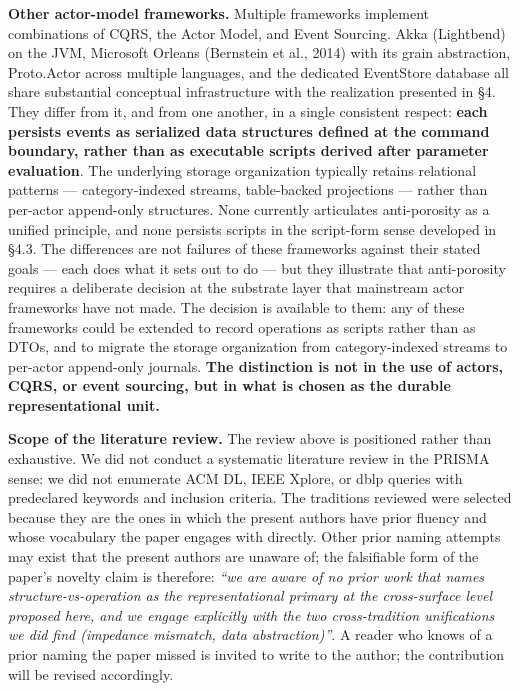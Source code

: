 \documentclass[
]{article}
\newcounter{none} %
\begin{document}
\textbf{Other actor-model frameworks.} Multiple frameworks implement
combinations of CQRS, the Actor Model, and Event Sourcing. Akka
(Lightbend) on the JVM, Microsoft Orleans (Bernstein et al., 2014) with
its grain abstraction, Proto.Actor across multiple languages, and the
dedicated EventStore database all share substantial conceptual
infrastructure with the realization presented in §4. They differ from
it, and from one another, in a single consistent respect: \textbf{each
persists events as serialized data structures defined at the command
boundary, rather than as executable scripts derived after parameter
evaluation}. The underlying storage organization typically retains
relational patterns --- category-indexed streams, table-backed
projections --- rather than per-actor append-only structures. None
currently articulates anti-porosity as a unified principle, and none
persists scripts in the script-form sense developed in §4.3. The
differences are not failures of these frameworks against their stated
goals --- each does what it sets out to do --- but they illustrate that
anti-porosity requires a deliberate decision at the substrate layer that
mainstream actor frameworks have not made. The decision is available to
them: any of these frameworks could be extended to record operations as
scripts rather than as DTOs, and to migrate the storage organization
from category-indexed streams to per-actor append-only journals.
\textbf{The distinction is not in the use of actors, CQRS, or event
sourcing, but in what is chosen as the durable representational unit.}

\textbf{Scope of the literature review.} The review above is positioned
rather than exhaustive. We did not conduct a systematic literature
review in the PRISMA sense: we did not enumerate ACM DL, IEEE Xplore, or
dblp queries with predeclared keywords and inclusion criteria. The
traditions reviewed were selected because they are the ones in which the
present authors have prior fluency and whose vocabulary the paper
engages with directly. Other prior naming attempts may exist that the
present authors are unaware of; the falsifiable form of the paper's
novelty claim is therefore: \emph{``we are aware of no prior work that
names structure-vs-operation as the representational primary at the
cross-surface level proposed here, and we engage explicitly with the two
cross-tradition unifications we did find (impedance mismatch, data
abstraction)''}. A reader who knows of a prior naming the paper missed
is invited to write to the author; the contribution will be revised
accordingly.
\end{document}
